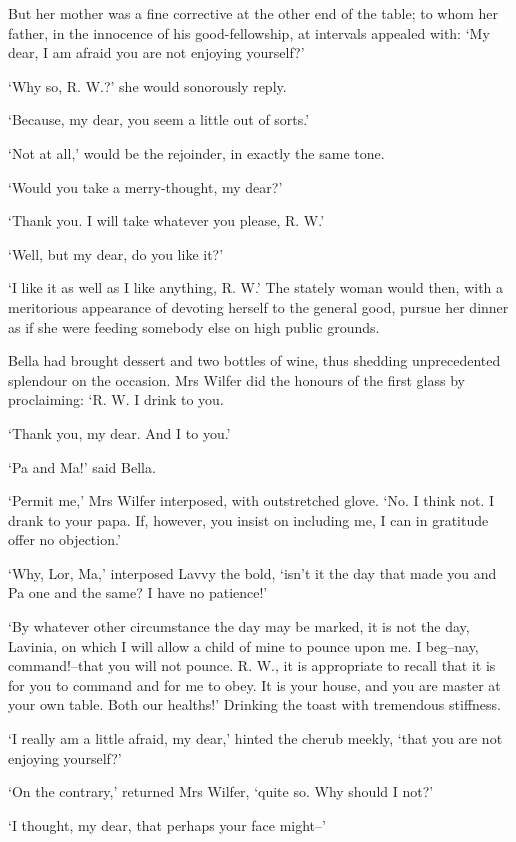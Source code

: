 But her mother was a fine corrective at the other end of the table; to
whom her father, in the innocence of his good-fellowship, at intervals
appealed with: ‘My dear, I am afraid you are not enjoying yourself?’

‘Why so, R. W.?’ she would sonorously reply.

‘Because, my dear, you seem a little out of sorts.’

‘Not at all,’ would be the rejoinder, in exactly the same tone.

‘Would you take a merry-thought, my dear?’

‘Thank you. I will take whatever you please, R. W.’

‘Well, but my dear, do you like it?’

‘I like it as well as I like anything, R. W.’ The stately woman would
then, with a meritorious appearance of devoting herself to the general
good, pursue her dinner as if she were feeding somebody else on high
public grounds.

Bella had brought dessert and two bottles of wine, thus shedding
unprecedented splendour on the occasion. Mrs Wilfer did the honours of
the first glass by proclaiming: ‘R. W. I drink to you.

‘Thank you, my dear. And I to you.’

‘Pa and Ma!’ said Bella.

‘Permit me,’ Mrs Wilfer interposed, with outstretched glove. ‘No. I
think not. I drank to your papa. If, however, you insist on including
me, I can in gratitude offer no objection.’

‘Why, Lor, Ma,’ interposed Lavvy the bold, ‘isn’t it the day that made
you and Pa one and the same? I have no patience!’

‘By whatever other circumstance the day may be marked, it is not the
day, Lavinia, on which I will allow a child of mine to pounce upon me.
I beg--nay, command!--that you will not pounce. R. W., it is appropriate
to recall that it is for you to command and for me to obey. It is your
house, and you are master at your own table. Both our healths!’ Drinking
the toast with tremendous stiffness.

‘I really am a little afraid, my dear,’ hinted the cherub meekly, ‘that
you are not enjoying yourself?’

‘On the contrary,’ returned Mrs Wilfer, ‘quite so. Why should I not?’

‘I thought, my dear, that perhaps your face might--’

